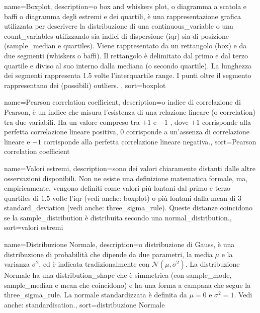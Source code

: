 {
	 name={Boxplot},
	 description={o box and whiskers plot, o diagramma a scatola e baffi o diagramma degli estremi e dei quartili, \`e una rappresentazione grafica utilizzata per descrivere la distribuzione di una \gls{continuous_variable} o una \gls{count_variables} utilizzando sia indici di dispersione (\gls{iqr}) sia di posizione (\gls{sample_median} e \gls{quartiles}). Viene rappresentato da un rettangolo (box) e da due segmenti (whiskers o baffi). Il rettangolo \`e delimitato dal primo e dal terzo quartile e diviso al suo interno dalla mediana (o secondo quartile). La lunghezza dei segmenti rappresenta 1.5 volte l'interquartile range. I punti oltre il segmento rappresentano dei (possibili) \gls{outliers}. },
	 sort={boxplot}
}

{
	 name={Pearson correlation coefficient},
	 description={o indice di correlazione di Pearson, \`e un indice che misura l'esistenza di una relazione lineare (o \gls{correlation}) tra due variabili. Ha un valore compreso tra $+ 1$ e $- 1$ , dove $+ 1$ corrisponde alla perfetta correlazione lineare positiva, $0$ corrisponde a un'assenza di correlazione lineare e $- 1$ corrisponde alla perfetta correlazione lineare negativa.},
	 sort={Pearson correlation coefficient}
}

{
	 name={Valori estremi},
	 description={sono dei valori chiaramente distanti dalle altre osservazioni disponibili. Non ne esiste una definizione matematica formale, ma, empiricamente, vengono definiti come valori pi\`u lontani dal primo e terzo \gls{quartiles} di $1.5$ volte l'\gls{iqr} (vedi anche: \gls{boxplot}) o pi\`u lontani dalla \gls{mean} di $3$ \gls{standard_deviation} (vedi anche: \gls{three_sigma_rule}). Queste distanze coincidono se la \gls{sample_distribution} \`e distribuita secondo una \gls{normal_distribution}.},
	 sort={valori estremi}
}




{
	 name={Distribuzione Normale},
	 description={o distribuzione di Gauss, \`e una distribuzione di probabilit\`a che dipende da due parametri, la media $\mu$ e la varianza $\sigma ^{2}$, ed \`e indicata tradizionalmente con $\mathcal{N} (\mu, \sigma^2)$. La distribuzione Normale ha una \gls{distribution_shape} che \`e simmetrica (con \gls{sample_mode}, \gls{sample_median} e \gls{mean} che coincidono) e ha una forma a campana che segue la \gls{three_sigma_rule}. La normale standardizzata \`e definita da $\mu = 0 \text{ e } \sigma^2 = 1$. Vedi anche: \gls{standardisation}.},
	 sort={distribuzione Normale}
}

